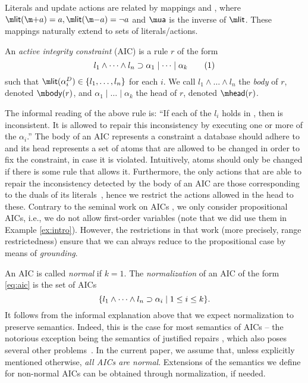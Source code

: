 Literals and update actions are related by mappings \litof and \actof, where $\litof(\add a)= a, \litof(\remove a) = \lnot a$ and $\actof$ is the inverse of $\litof$.
These mappings naturally extend to sets of literals/actions. 

\begin{definition}
 An \emph{active integrity constraint} (AIC) is a rule $r$ of the form
  \begin{equation} l_1\land \dots\land l_n\supset \alpha_1\mid\dots \mid \alpha_k \tag{1}\label{eq:aic}\end{equation}
  such that $\litof(\alpha_i^D) \in \{l_1,\dots,l_n\}$ for each $i$.
%  
  We call $l_1\land \dots \land l_n$ the \emph{body} of $r$, denoted $\body(r)$, and $\alpha_1\mid\dots \mid \alpha_k$ the head of $r$, denoted $\head (r)$.
\end{definition}

The informal reading of the above rule is: ``If each of the $l_i$ holds in \db, then \db is inconsistent. 
It is allowed to repair this inconsistency by executing one or more of the $\alpha_i$.''
The body of an AIC represents a constraint a database should adhere to and its head represents a set of atoms that are allowed to be changed in order to fix the constraint, in case it is violated. 
Intuitively, atoms should only be changed if there is some rule that allows it.
Furthermore, the only actions that are able to repair the inconsistency detected by the body of an AIC are those corresponding to the duals of its literals~\cite{iclp/CaropreseGSZ06}, hence we restrict the actions allowed in the head to these. 
Contrary to the seminal work on AICs \cite{ppdp/FlescaGZ04}, we only consider propositional AICs, i.e., we do not allow first-order variables (note that we did use them in Example \ref{ex:intro}). 
However, the restrictions in that work (more precisely, range restrictedness) ensure that we can always reduce to the propositional case by means of \emph{grounding}. 


An AIC is called \emph{normal} if $k=1$. The \emph{normalization} of an AIC of the form \eqref{eq:aic} is the set of AICs 
\[\{l_1\land \dots\land l_n\supset \alpha_i\mid 1\leq i\leq k\}.\]
It follows from the informal explanation above that we expect normalization to preserve semantics. Indeed, this is the case for most semantics of AICs -- the notorious exception being the semantics of justified repairs \cite{tplp/CaropreseT11}, which also poses several other problems~\cite{tase/Cruz-FilipeGEN13}.
In the current paper, we assume that, unless explicitly mentioned otherwise, \emph{all AICs are normal}. Extensions of the semantics we define for non-normal AICs can be obtained through normalization, if needed.

